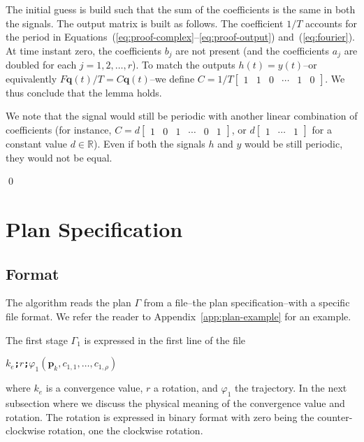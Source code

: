 \documentclass[letterpaper,10pt,conference]{ieeeconf}
\theoremstyle{definition}
\begin{document}
The initial guess is build such that the sum of the coefficients is the same in both the signals. The output matrix is built as follows. The coefficient $1/T$ accounts for the period in Equations~(\ref{eq:proof-complex}--\ref{eq:proof-output}) and~(\ref{eq:fourier}). At time instant zero, the coefficients $b_j$ are not present (and the coefficients $a_j$ are doubled for each $j=1,2,\dots,r$). To match the outputs $h(t)=y(t)$--or equivalently $F\mathbf{q}(t)/T=C\mathbf{q}(t)$--we define $C=1/T\begin{bmatrix}1 & 1 & 0 & \cdots & 1 & 0\end{bmatrix}$. We thus conclude that the lemma holds.

We note that the signal would still be periodic with another linear combination of coefficients (for instance, $C=d\begin{bmatrix}1 & 0 & 1 & \cdots & 0 & 1\end{bmatrix}$, or $d\begin{bmatrix}1 & \cdots & 1\end{bmatrix}$ for a constant value $d\in\mathbb{R}$). Even if both the signals $h$ and $y$ would be still periodic, they would not be equal.

\qed


\section{Plan Specification}

\subsection{Format}
\label{app:plan-spec}

The algorithm reads the plan $\Gamma$ from a file--the plan specification--with a specific file format. We refer the reader to Appendix~\ref{app:plan-example} for an example.

The first stage $\Gamma_1$ is expressed in the first line of the file
\begin{algorithmic}[1]
  \State\textbf{\texttt{$k_e$;$r$;$\varphi_1(\mathbf{p}_k,c_{1,1},\dots,c_{1,\rho})$}}\label{code:stage}
\end{algorithmic}
where $k_e$ is a convergence value, $r$ a rotation, and $\varphi_1$ the trajectory. In the next subsection where we discuss the physical meaning of the convergence value and rotation. The rotation is expressed in binary format with zero being the counter-clockwise rotation, one the clockwise rotation.
\end{document}
